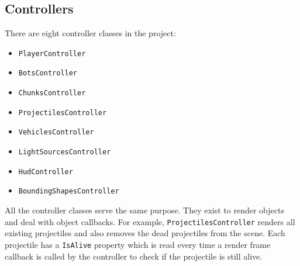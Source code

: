 \subsection{Controllers}

There are eight controller classes in the project:

\begin{itemize}
    \item  \texttt{PlayerController}
    \item \texttt{BotsController}
    \item \texttt{ChunksController}
    \item \texttt{ProjectilesController}
    \item \texttt{VehiclesController}
    \item \texttt{LightSourcesController}
    \item \texttt{HudController}
    \item \texttt{BoundingShapesController}
\end{itemize}

All the controller classes serve the same purpose.
They exist to render objects and deal with object callbacks.
For example, \texttt{ProjectilesController} renders all existing projectiles and also removes the dead projectiles from the scene.
Each projectile has a \texttt{IsAlive} property which is read every time a render frame callback is called by the controller to check if the projectile is still alive.
